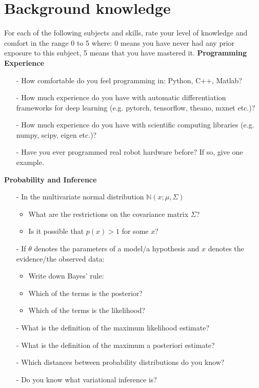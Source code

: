 \documentclass{article}
\begin{document}
\section{Background knowledge}
For each of the following subjects and skills, rate your level of knowledge and comfort in the range 0 to 5 where: 0 means you have never had any prior exposure to this subject, 5 means that you have mastered it.
\newline
\newline
\noindent \textbf{Programming Experience}
\begin{itemize}
\item[-] How comfortable do you feel programming in: Python,  C++, Matlab?
\item[-] How much experience do you have with automatic differentiation frameworks for deep learning (e.g. pytorch, tensorflow, theano, mxnet etc.)?
\item[-] How much experience do you have with scientific computing libraries (e.g. numpy, scipy, eigen etc.)?
\item[-] Have you ever programmed real robot hardware before? If so, give one example.

\end{itemize}
\quad
\newline
\noindent \textbf{Probability and Inference}
\begin{itemize}
\item[-] In the multivariate normal distribution $\mathbb{N}(x; \mu, \Sigma)$
  \begin{itemize}
  \item What are the restrictions on the covariance matrix $\Sigma$?
  \item Is it possible that $p(x) > 1$ for some $x$?
  \end{itemize}

\item[-] If $\theta$ denotes the parameters of a model/a hypothesis and $x$ denotes the evidence/the observed data:
  \begin{itemize}
  \item Write down Bayes' rule:
  \item Which of the terms is the posterior?
  \item Which of the terms is the likelihood?
  \end{itemize}
\item[-] What is the definition of the maximum likelihood estimate?
\item[-] What is the definition of the maximum a posteriori estimate?
\item[-] Which distances between probability distributions do you know?
\item[-] Do you know what variational inference is?
\end{itemize}
\end{document}
